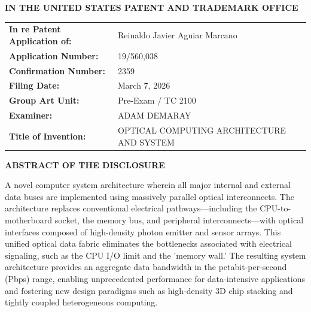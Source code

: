 \documentclass[11pt,letterpaper]{article}
\begin{document}
\thispagestyle{empty}

\begin{center}
    \large\textbf{IN THE UNITED STATES PATENT AND TRADEMARK OFFICE} \\
\end{center}

\vspace{0.2cm}
\noindent\begin{tabular}{p{2.3in}p{4.0in}}
\textbf{In re Patent Application of:} & Reinaldo Javier Aguiar Marcano \\
\textbf{Application Number:} & 19/560,038 \\
\textbf{Confirmation Number:} & 2359 \\
\textbf{Filing Date:} & March 7, 2026 \\
\textbf{Group Art Unit:} & Pre-Exam / TC 2100 \\
\textbf{Examiner:} & ADAM DEMARAY \\
\textbf{Title of Invention:} & OPTICAL COMPUTING ARCHITECTURE AND SYSTEM \\
\end{tabular}

\vspace{0.6cm}
\begin{center}
    \textbf{\large ABSTRACT OF THE DISCLOSURE}
\end{center}

A novel computer system architecture wherein all major internal and external data buses are implemented using massively parallel optical interconnects. The architecture replaces conventional electrical pathways---including the CPU-to-motherboard socket, the memory bus, and peripheral interconnects---with optical interfaces composed of high-density photon emitter and sensor arrays. This unified optical data fabric eliminates the bottlenecks associated with electrical signaling, such as the CPU I/O limit and the 'memory wall.' The resulting system architecture provides an aggregate data bandwidth in the petabit-per-second (Pbps) range, enabling unprecedented performance for data-intensive applications and fostering new design paradigms such as high-density 3D chip stacking and tightly coupled heterogeneous computing.
\end{document}
